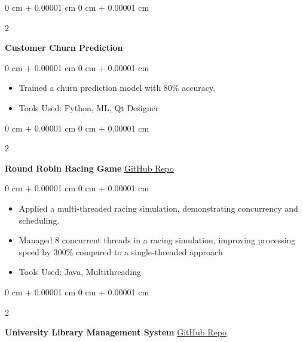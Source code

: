 \documentclass[10pt, letterpaper]{article}
\newenvironment{highlights}{
    \begin{itemize}[
        topsep=0.10 cm,
        parsep=0.10 cm,
        partopsep=0pt,
        itemsep=0pt,
        leftmargin=0 cm + 10pt
    ]
}{
    \end{itemize}
} %
\newenvironment{onecolentry}{
    \begin{adjustwidth}{
        0 cm + 0.00001 cm
    }{
        0 cm + 0.00001 cm
    }
}{
    \end{adjustwidth}
} %
\newenvironment{twocolentry}[2][]{
    \onecolentry
    \def\secondColumn{#2}
    \setcolumnwidth{\fill, 4.5 cm}
    \begin{paracol}{2}
}{
    \switchcolumn \raggedleft \secondColumn
    \end{paracol}
    \endonecolentry
} %
\begin{document}
        
        \begin{twocolentry}{
        }
            \textbf{Customer Churn Prediction}\end{twocolentry}

        \vspace{0.10 cm}
        \begin{onecolentry}
            \begin{highlights}
                \item Trained a churn prediction model with 80\% accuracy.
                \item Tools Used: Python, ML, Qt Designer
            \end{highlights}
        \end{onecolentry}


        \vspace{0.2 cm}

        \begin{twocolentry}{
            \href{https://github.com/MohamedMaged9258/Round-Robin-Racing-Game}{GitHub Repo}
        }
            \textbf{Round Robin Racing Game}\end{twocolentry}

        \vspace{0.10 cm}
        \begin{onecolentry}
            \begin{highlights}
                \item Applied a multi-threaded racing simulation, demonstrating concurrency and scheduling.
                \item Managed 8 concurrent threads in a racing simulation, improving processing speed by 300\% compared to a single-threaded approach
                \item Tools Used: Java, Multithreading
            \end{highlights}
        \end{onecolentry}


        \vspace{0.2 cm}

        \begin{twocolentry}{
            \href{https://github.com/MohamedMaged9258/University-Library-Management-System}{GitHub Repo}
        }
            \textbf{University Library Management System}\end{twocolentry}
\end{document}
